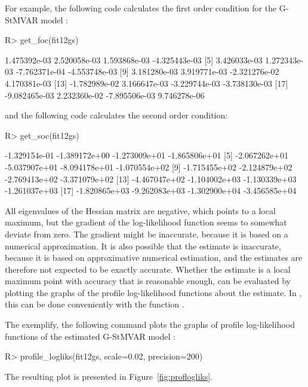 \documentclass[nojss]{jss}
\begin{document}
For example, the following code calculates the first order condition for the G-StMVAR model :
%
\begin{CodeChunk}
\begin{CodeInput}
R> get_foc(fit12gs)
\end{CodeInput}
\begin{CodeOutput}
 [1]  1.475392e-03  2.520058e-03  1.593868e-03 -4.325443e-03
 [5]  3.426033e-03  1.272343e-03 -7.762371e-04 -4.553748e-03
 [9]  3.181280e-03  3.919771e-03 -2.321276e-02  4.170381e-03
[13] -1.782989e-02  3.166647e-03 -3.229744e-03 -3.738130e-03
[17] -9.082465e-03  2.232360e-02 -7.895506e-03  9.746278e-06
\end{CodeOutput}
\end{CodeChunk}
%
and the following code calculates the second order condition:
%
\begin{CodeChunk}
\begin{CodeInput}
R> get_soc(fit12gs)
\end{CodeInput}
\begin{CodeOutput}
 [1] -1.329154e-01 -1.389172e+00 -1.273009e+01 -1.865806e+01
 [5] -2.067262e+01 -5.037907e+01 -8.094178e+01 -1.070554e+02
 [9] -1.715455e+02 -2.124879e+02 -2.769413e+02 -3.371079e+02
[13] -4.467047e+02 -1.104002e+03 -1.130339e+03 -1.261037e+03
[17] -1.820865e+03 -9.262083e+03 -1.302900e+04 -3.456585e+04
\end{CodeOutput}
\end{CodeChunk}
%
All eigenvalues of the Hessian matrix are negative, which points to a local maximum, but the gradient of the log-likelihood function seems to somewhat deviate from zero. The gradient might be inaccurate, because it is based on a numerical approximation. It is also possible that the estimate is inaccurate, because it is based on approximative numerical estimation, and the estimates are therefore not expected to be exactly accurate. Whether the estimate is a local maximum point with accuracy that is reasonable enough, can be evaluated by plotting the graphs of the profile log-likelihood functions about the estimate. In , this can be done conveniently with the function .

The exemplify, the following command plots the graphs of profile log-likelihood functions of the estimated G-StMVAR model :
%
\begin{CodeChunk}
\begin{CodeInput}
R> profile_logliks(fit12gs, scale=0.02, precision=200)
\end{CodeInput}
\end{CodeChunk}
%
The resulting plot is presented in Figure~\ref{fig:proflogliks}.
\end{document}
